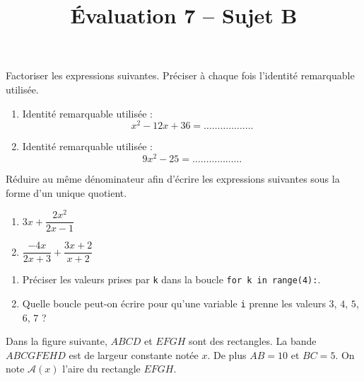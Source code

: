 \documentclass[a4paper,dvipsnames]{article}
\begin{document}
\title{Évaluation 7 -- Sujet B}
\author{}
\date{}

\maketitle{}

\pagestyle{empty}
\thispagestyle{empty}

\exo[3 points] Factoriser les expressions suivantes. Préciser à chaque fois l'identité remarquable utilisée.
\begin{enumerate}
  \item Identité remarquable utilisée : \dotfill\\
    \[x^2-12x+36=\hdots\hdots\hdots\hdots\hdots\hdots\]
  \item Identité remarquable utilisée : \dotfill\\
    \[9x^2-25=\hdots\hdots\hdots\hdots\hdots\hdots\]
\end{enumerate}

\bigskip

\exo[3 points] Réduire au même dénominateur afin d'écrire les expressions suivantes sous la forme d'un unique quotient.
\begin{multicols}{2}
  \begin{enumerate}
    \item $3x+\dfrac{2x^2}{2x-1}$
    \item $\dfrac{-4x}{2x+3}+\dfrac{3x+2}{x+2}$
  \end{enumerate}
\end{multicols}
\dotfill{}

\bigskip

\exo[2 points] \vspace{-2mm}
\begin{enumerate}
  \item Préciser les valeurs prises par \texttt{k} dans la boucle \texttt{for k in range(4):}.
  \item Quelle boucle peut-on écrire pour qu'une variable \texttt{i} prenne les valeurs $3$, $4$, $5$, $6$, $7$ ?
\end{enumerate}

\pagebreak

\exo[4 points] Dans la figure suivante, $ABCD$ et $EFGH$ sont des rectangles. La \og{}bande\fg{} $ABCGFEHD$ est de largeur constante notée $x$. De plus $AB=10$ et $BC=5$. On note $\mathcal{A}(x)$ l'aire du rectangle $EFGH$.
\end{document}
